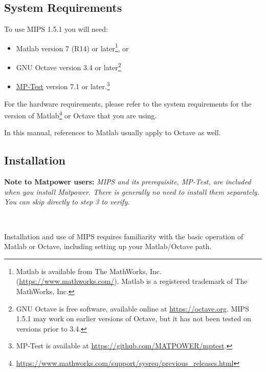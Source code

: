 \documentclass[12pt]{article}
\newcommand{\matlab}[0]{{\sc Matlab}}
\newcommand{\matpower}[0]{{\sc Matpower}}
\newcommand{\mptest}[0]{{MP-Test}}
\newcommand{\mptesturl}[0]{https://github.com/MATPOWER/mptest}
\newcommand{\mptestlink}[0]{\href{\mptesturl}{\mptest{}}}
\newcommand{\mips}[0]{{MIPS}}
\newcommand{\mipsver}[0]{1.5.1}
\numberwithin{equation}{section}
\numberwithin{table}{section}
\numberwithin{figure}{section}
\begin{document}
\subsection{System Requirements}
\label{sec:sysreq}
To use \mips{} \mipsver{} you will need:
\begin{itemize}
\item \matlab{}\textsuperscript{\tiny \textregistered} version 7 (R14) or later\footnote{\matlab{} is available from The MathWorks, Inc. (\url{https://www.mathworks.com/}). \matlab{} is a registered trademark of The MathWorks, Inc.}, or
\item GNU Octave version 3.4 or later\footnote{GNU Octave \cite{octave} is free software, available online at \url{https://octave.org}. \mips{} \mipsver{} may work on earlier versions of Octave, but it has not been tested on versions prior to 3.4.}
\item \mptestlink{} version 7.1 or later.\footnote{\mptest{} is available at \url{\mptesturl}.}
\end{itemize}

For the hardware requirements, please refer to the system requirements for the version of \matlab{}\footnote{\url{https://www.mathworks.com/support/sysreq/previous_releases.html}} or Octave that you are using.

In this manual, references to \matlab{} usually apply to Octave as well.

\subsection{Installation}
\label{sec:installation}

{\bf Note to \matpower{} users:} \emph{\mips{} and its prerequisite, \mptest{}, are included when you install \matpower{}. There is generally no need to install them separately. You can skip directly to step 3 to verify.}

~

Installation and use of \mips{} requires familiarity with the basic operation of \matlab{} or Octave, including setting up your \matlab{}/Octave path.
\end{document}
